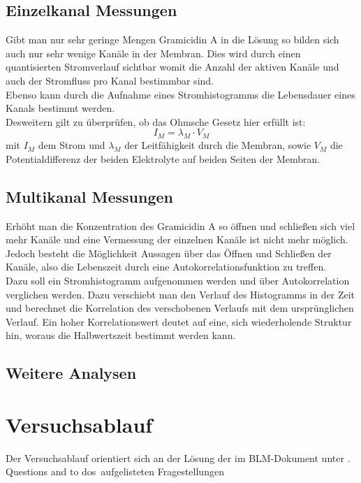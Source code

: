 \documentclass{include/thesisclass3}
\newcommand{\cc}{\cdot}
\begin{document}


\section{Einzelkanal Messungen}
Gibt man nur sehr geringe Mengen Gramicidin A in die Lösung so bilden sich auch nur sehr wenige Kanäle in der Membran. Dies wird durch einen quantisierten Stromverlauf sichtbar womit die Anzahl der aktiven Kanäle und auch der Stromfluss pro Kanal bestimmbar sind.\\
Ebenso kann durch die Aufnahme eines Stromhistogramms die Lebensdauer eines Kanals bestimmt werden.\\
Desweitern gilt zu überprüfen, ob das Ohmsche Gesetz hier erfüllt ist:
\[ I_M = \lambda_M \cc V_M\]
mit $I_M$ dem Strom und $\lambda_M$ der Leitfähigkeit durch die Membran, sowie $V_M$ die Potentialdifferenz der beiden Elektrolyte auf beiden Seiten der Membran.


\section{Multikanal Messungen}
Erhöht man die Konzentration des Gramicidin A so öffnen und schließen sich viel mehr Kanäle und eine Vermessung der einzelnen Kanäle ist nicht mehr möglich. Jedoch besteht die Möglichkeit Aussagen über das Öffnen und Schließen der Kanäle, also die Lebenszeit durch eine Autokorrelationsfunktion zu treffen.\\
Dazu soll ein Stromhistogramm aufgenommen werden und über Autokorrelation verglichen werden. Dazu verschiebt man den Verlauf des Histogramms in der Zeit und berechnet die Korrelation des verschobenen Verlaufs mit dem ursprünglichen Verlauf. Ein hoher Korrelationswert deutet auf eine, sich wiederholende Struktur hin, woraus die Halbwertszeit bestimmt werden kann.

\section{Weitere Analysen}







\chapter{Versuchsablauf}
Der Versuchsablauf orientiert sich an der Lösung der im BLM-Dokument unter . Questions and to dos\grqq  ~aufgelisteten Fragestellungen
\end{document}
